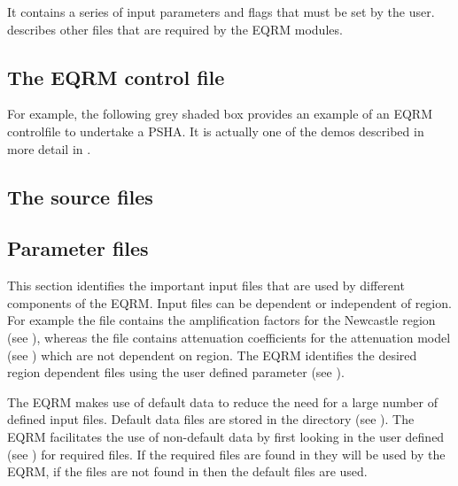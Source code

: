 It contains a series of input parameters and flags that must be set
by the user.  describes other files
that are required by the EQRM modules.

\subsection{The EQRM control file}
\label{sec:application-EQRMcf}




\clearpage For example, the following grey shaded box provides an
example of an EQRM controlfile to undertake a PSHA. It is actually
one of the demos described in more detail in
.




\clearpage
\subsection{The source files}





\subsection{Parameter files}
\label{sec:application-parfiles}

This section identifies the important input files that are used by
different components of the EQRM. Input files can be dependent or
independent of region. For example the file
  contains the amplification factors
for the Newcastle region (see ), whereas the file
contains attenuation coefficients for the \citet*{dr_Toro97a}
attenuation model (see ) which are not dependent on
region. The EQRM identifies the desired region dependent files
using the user defined parameter  (see
).

The EQRM makes use of default data to reduce the need for a large
number of defined input files. Default data files are stored in
the directory  (see
). The EQRM facilitates the use of
non-default data by first looking in the user defined
  (see ) for
required files. If the required files are found in
  they will be used by the EQRM, if the files
are not found in   then the default files
are used.

